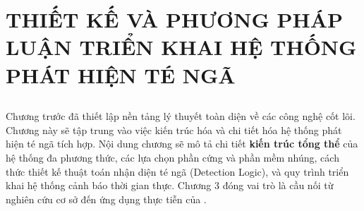 \chapter[THIẾT KẾ HỆ THỐNG CẢNH BÁO TÉ NGÃ]{THIẾT KẾ VÀ PHƯƠNG PHÁP LUẬN TRIỂN KHAI HỆ THỐNG PHÁT HIỆN TÉ NGÃ}
\label{chap:methodology} %

\section*{} %
Chương trước đã thiết lập nền tảng lý thuyết toàn diện về các công nghệ cốt lõi. Chương này sẽ tập trung vào việc kiến trúc hóa và chi tiết hóa hệ thống phát hiện té ngã tích hợp. Nội dung chương sẽ mô tả chi tiết \textbf{kiến trúc tổng thể} của hệ thống đa phương thức, các lựa chọn phần cứng và phần mềm nhúng, cách thức thiết kế thuật toán nhận diện té ngã (Detection Logic), và quy trình triển khai hệ thống cảnh báo thời gian thực. Chương 3 đóng vai trò là cầu nối từ nghiên cứu cơ sở đến ứng dụng thực tiễn của \TENLUANVAN.




